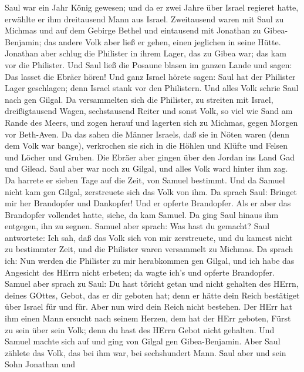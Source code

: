  Saul war ein Jahr König gewesen; und da er zwei Jahre über
Israel regieret hatte,  erwählte er ihm dreitausend Mann aus
Israel. Zweitausend waren mit Saul zu Michmas und auf dem Gebirge Bethel
und eintausend mit Jonathan zu Gibea- Benjamin; das andere Volk aber
ließ er gehen, einen jeglichen in seine Hütte.  Jonathan
aber schlug die Philister in ihrem Lager, das zu Gibea war; das kam vor
die Philister. Und Saul ließ die Posaune blasen im ganzen Lande und
sagen: Das lasset die Ebräer hören!  Und ganz Israel hörete
sagen: Saul hat der Philister Lager geschlagen; denn Israel stank vor
den Philistern. Und alles Volk schrie Saul nach gen Gilgal. 
Da versammelten sich die Philister, zu streiten mit Israel,
dreißigtausend Wagen, sechstausend Reiter und sonst Volk, so viel wie
Sand am Rande des Meers, und zogen herauf und lagerten sich zu Michmas,
gegen Morgen vor Beth-Aven.  Da das sahen die Männer
Israels, daß sie in Nöten waren (denn dem Volk war bange), verkrochen
sie sich in die Höhlen und Klüfte und Felsen und Löcher und Gruben.
 Die Ebräer aber gingen über den Jordan ins Land Gad und
Gilead. Saul aber war noch zu Gilgal, und alles Volk ward hinter ihm
zag.  Da harrete er sieben Tage auf die Zeit, von Samuel
bestimmt. Und da Samuel nicht kam gen Gilgal, zerstreuete sich das Volk
von ihm.  Da sprach Saul: Bringet mir her Brandopfer und
Dankopfer! Und er opferte Brandopfer.  Als er aber das
Brandopfer vollendet hatte, siehe, da kam Samuel. Da ging Saul hinaus
ihm entgegen, ihn zu segnen.  Samuel aber sprach: Was hast
du gemacht? Saul antwortete: Ich sah, daß das Volk sich von mir
zerstreuete, und du kamest nicht zu bestimmter Zeit, und die Philister
waren versammelt zu Michmas.  Da sprach ich: Nun werden die
Philister zu mir herabkommen gen Gilgal, und ich habe das Angesicht des
HErrn nicht erbeten; da wagte ich's und opferte Brandopfer.
 Samuel aber sprach zu Saul: Du hast töricht getan und
nicht gehalten des HErrn, deines GOttes, Gebot, das er dir geboten hat;
denn er hätte dein Reich bestätiget über Israel für und für.
 Aber nun wird dein Reich nicht bestehen. Der HErr hat ihm
einen Mann ersucht nach seinem Herzen, dem hat der HErr geboten, Fürst
zu sein über sein Volk; denn du hast des HErrn Gebot nicht gehalten.
 Und Samuel machte sich auf und ging von Gilgal gen
Gibea-Benjamin. Aber Saul zählete das Volk, das bei ihm war, bei
sechshundert Mann.  Saul aber und sein Sohn Jonathan und
